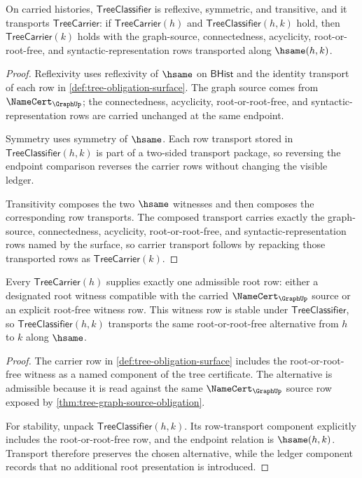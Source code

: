 \begin{theorem}\label{thm:tree-carrier-classifier-obligation}
On carried histories, $\mathsf{TreeClassifier}$ is reflexive, symmetric, and transitive, and it transports $\mathsf{TreeCarrier}$: if $\mathsf{TreeCarrier}(h)$ and $\mathsf{TreeClassifier}(h,k)$ hold, then $\mathsf{TreeCarrier}(k)$ holds with the graph-source, connectedness, acyclicity, root-or-root-free, and syntactic-representation rows transported along $\hsame(h,k)$.
\end{theorem}
\begin{proof}
Reflexivity uses reflexivity of $\hsame$ on $\mathsf{BHist}$ and the identity transport of each row in \autoref{def:tree-obligation-surface}. The graph source comes from $\NameCert_{\GraphUp}$; the connectedness, acyclicity, root-or-root-free, and syntactic-representation rows are carried unchanged at the same endpoint.

Symmetry uses symmetry of $\hsame$. Each row transport stored in $\mathsf{TreeClassifier}(h,k)$ is part of a two-sided transport package, so reversing the endpoint comparison reverses the carrier rows without changing the visible ledger.

Transitivity composes the two $\hsame$ witnesses and then composes the corresponding row transports. The composed transport carries exactly the graph-source, connectedness, acyclicity, root-or-root-free, and syntactic-representation rows named by the surface, so carrier transport follows by repacking those transported rows as $\mathsf{TreeCarrier}(k)$.
\end{proof}

\begin{theorem}\label{thm:tree-root-witness-obligation}
Every $\mathsf{TreeCarrier}(h)$ supplies exactly one admissible root row: either a designated root witness compatible with the carried $\NameCert_{\GraphUp}$ source or an explicit root-free witness row. This witness row is stable under $\mathsf{TreeClassifier}$, so $\mathsf{TreeClassifier}(h,k)$ transports the same root-or-root-free alternative from $h$ to $k$ along $\hsame$.
\end{theorem}
\begin{proof}
The carrier row in \autoref{def:tree-obligation-surface} includes the root-or-root-free witness as a named component of the tree certificate. The alternative is admissible because it is read against the same $\NameCert_{\GraphUp}$ source row exposed by \autoref{thm:tree-graph-source-obligation}.

For stability, unpack $\mathsf{TreeClassifier}(h,k)$. Its row-transport component explicitly includes the root-or-root-free row, and the endpoint relation is $\hsame(h,k)$. Transport therefore preserves the chosen alternative, while the ledger component records that no additional root presentation is introduced.
\end{proof}

